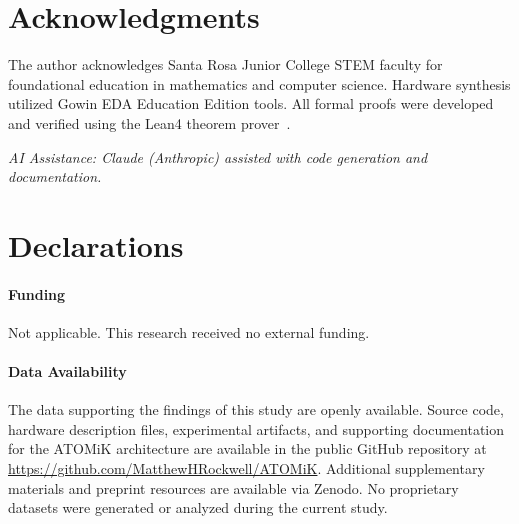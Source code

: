\documentclass[11pt,letterpaper]{article}
\theoremstyle{plain}
\theoremstyle{definition}
\theoremstyle{remark}
\begin{document}
\section*{Acknowledgments}

The author acknowledges Santa Rosa Junior College STEM faculty for foundational education in mathematics and computer science. Hardware synthesis utilized Gowin EDA Education Edition tools. All formal proofs were developed and verified using the Lean4 theorem prover~\cite{moura2021lean4}.

\vspace{0.5em}
\noindent\textit{AI Assistance: Claude (Anthropic) assisted with code generation and documentation.}

\section*{Declarations}

\paragraph{Funding} Not applicable. This research received no external funding.

\paragraph{Data Availability} The data supporting the findings of this study are openly available. Source code, hardware description files, experimental artifacts, and supporting documentation for the ATOMiK architecture are available in the public GitHub repository at \url{https://github.com/MatthewHRockwell/ATOMiK}. Additional supplementary materials and preprint resources are available via Zenodo. No proprietary datasets were generated or analyzed during the current study.

\newpage



\end{document}
